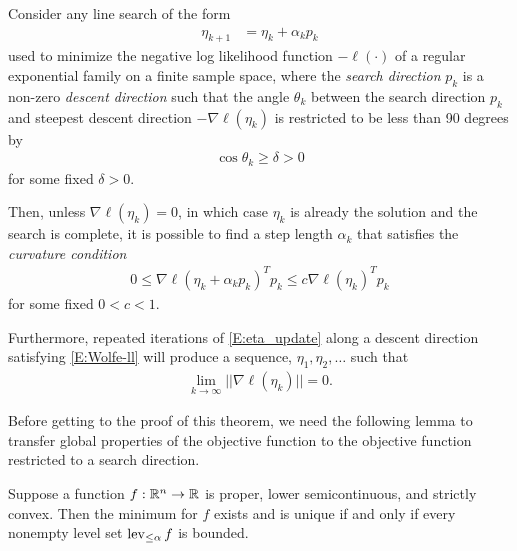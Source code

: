 \begin{theorem} \label{Thm:log like 
max}
Consider any line search of the form 
\begin{align}
	\eta_{k+1} &= \eta_k + \alpha_k p_k \label{E:eta_update}
\end{align}
used to minimize the negative log likelihood function $-\ell(\cdot)$ of a regular 
exponential family on a finite sample space, where the \emph{search direction} $p_k$ 
is a non-zero \emph{descent direction}
such that the angle $\theta_k$ between the search direction $p_k$ and steepest descent 
direction $-\nabla \ell(\eta_k)$ is 
restricted to be less than 90 degrees by
\begin{align*}
\cos \theta_k \geq \delta > 0
\end{align*}
 for some fixed $\delta > 0$.  

Then, unless $\nabla \ell(\eta_k) = 0$, in which case $\eta_k$ is already the solution 
and the search is complete, it is 
possible to find a step length $\alpha_k$ that satisfies the \emph{curvature 
condition}
\begin{align}
	0 \leq \nabla \ell( \eta_k + \alpha_k p_k)^T p_k  \leq c \nabla \ell(\eta_k)^T p_k  
\label{E:Wolfe-ll}
\end{align}
for some fixed $0 < c < 1$.

Furthermore, repeated iterations of \eqref{E:eta_update} along a descent direction 
satisfying \eqref{E:Wolfe-ll} will produce a sequence, $\eta_1, \eta_2, \ldots$ such 
that
\begin{align*}
	\lim_{k \to \infty} || \nabla \ell(\eta_k) || = 0.
\end{align*}
\end{theorem}

Before getting to the proof of this theorem, we need the 
following lemma to transfer global properties of the objective function to the 
objective function restricted to a 
search direction.

\begin{lemma} \label{Lemma:f min} 
Suppose a function $f:{\mathbb R}^n \to {\mathbb R}$ is proper, lower semicontinuous, and strictly 
convex.  Then the minimum for $f$ 
exists and is unique if and only if every nonempty level set $\operatorname{lev}_{\leq \alpha} f$ is 
bounded.
\end{lemma}

